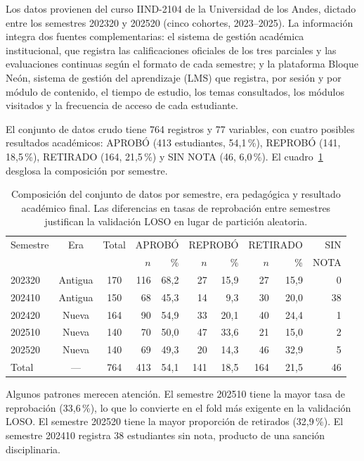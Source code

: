 \documentclass[12pt, letterpaper, openany]{report}
\begin{document}
Los datos provienen del curso IIND-2104 de la Universidad de los Andes, dictado entre los semestres 202320 y 202520 (cinco cohortes, 2023--2025). La información integra dos fuentes complementarias: el sistema de gestión académica institucional, que registra las calificaciones oficiales de los tres parciales y las evaluaciones continuas según el formato de cada semestre; y la plataforma Bloque Neón, sistema de gestión del aprendizaje (LMS) que registra, por sesión y por módulo de contenido, el tiempo de estudio, los temas consultados, los módulos visitados y la frecuencia de acceso de cada estudiante.

El conjunto de datos crudo tiene 764 registros y 77 variables, con cuatro posibles resultados académicos: APROBÓ (413 estudiantes, 54,1\,\%), REPROBÓ (141, 18,5\,\%), RETIRADO (164, 21,5\,\%) y SIN NOTA (46, 6,0\,\%). El cuadro~\ref{tab:composicion_semestral} desglosa la composición por semestre.

\begin{table}[htbp]
  \centering
  \caption{Composición del conjunto de datos por semestre, era pedagógica y resultado académico final. Las diferencias en tasas de reprobación entre semestres justifican la validación LOSO en lugar de partición aleatoria.}
  \label{tab:composicion_semestral}
  \small
  \begin{tabular}{lccrrrrrrr}
    \toprule
    Semestre & Era & Total
      & \multicolumn{2}{c}{APROBÓ}
      & \multicolumn{2}{c}{REPROBÓ}
      & \multicolumn{2}{c}{RETIRADO}
      & SIN \\
    \cmidrule(lr){4-5}\cmidrule(lr){6-7}\cmidrule(lr){8-9}
    & & & $n$ & \% & $n$ & \% & $n$ & \% & NOTA \\
    \midrule
    202320 & Antigua & 170 & 116 & 68,2 &  27 & 15,9 &  27 & 15,9 & 0  \\
    202410 & Antigua & 150 &  68 & 45,3 &  14 &  9,3 &  30 & 20,0 & 38 \\
    202420 & Nueva   & 164 &  90 & 54,9 &  33 & 20,1 &  40 & 24,4 & 1  \\
    202510 & Nueva   & 140 &  70 & 50,0 &  47 & 33,6 &  21 & 15,0 & 2  \\
    202520 & Nueva   & 140 &  69 & 49,3 &  20 & 14,3 &  46 & 32,9 & 5  \\
    \midrule
    Total  & ---     & 764 & 413 & 54,1 & 141 & 18,5 & 164 & 21,5 & 46 \\
    \bottomrule
  \end{tabular}
\end{table}
\FloatBarrier
Algunos patrones merecen atención. El semestre 202510 tiene la mayor tasa de reprobación (33,6\,\%), lo que lo convierte en el fold más exigente en la validación LOSO. El semestre 202520 tiene la mayor proporción de retirados (32,9\,\%). El semestre 202410 registra 38 estudiantes sin nota, producto de una sanción disciplinaria.
\end{document}
